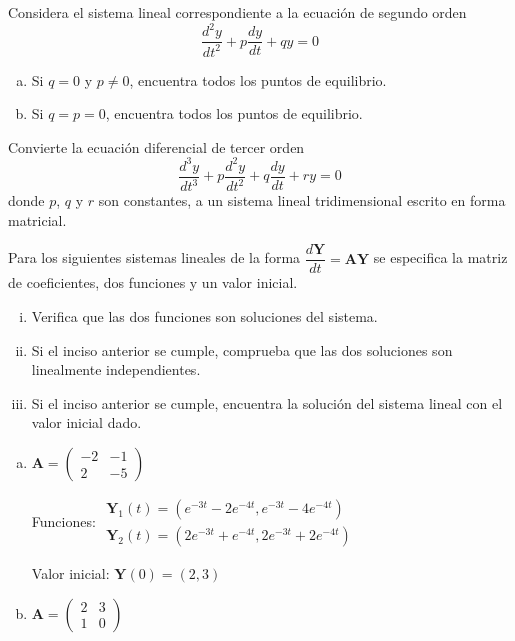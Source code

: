 \documentclass[12pt]{exam}
\begin{document}
    
    \begin{questions}
     \question%
     Considera el sistema lineal correspondiente a la ecuación de segundo orden $$\frac{d^2y}{dt^2}+p\frac{dy}{dt}+qy=0$$
     \begin{enumerate}[a)]
         \item Si $q=0$ y $p\neq0$, encuentra todos los puntos de equilibrio.
         \item Si $q=p=0$, encuentra todos los puntos de equilibrio.
     \end{enumerate}


     \question%
     Convierte la ecuación diferencial de tercer orden $$\frac{d^3y}{dt^3}+p\frac{d^2y}{dt^2}+q\frac{dy}{dt}+ry=0$$ donde $p$, $q$ y $r$ son constantes, a un sistema lineal tridimensional escrito en forma matricial.

     
     \question%
     Para los siguientes sistemas lineales de la forma $\dfrac{d\mathbf{Y}}{dt}=\mathbf{AY}$ se especifica la matriz de coeficientes,  dos funciones y un valor inicial. 
     \begin{enumerate}[i)]
         \item      Verifica que las dos funciones son soluciones del sistema.
         \item		Si el inciso anterior se cumple, comprueba que las dos soluciones son linealmente independientes.
          \item		Si el inciso anterior se cumple, encuentra la solución del sistema lineal con el valor inicial dado.
    \end{enumerate}
\vskip 20pt
    \begin{enumerate}[a)]
        \item $\mathbf{A}=\left(\begin{matrix}-2&-1\\2&-5\end{matrix}\right)$
        
        Funciones: $\begin{matrix}\mathbf{Y}_1(t)=(e^{-3t}-2e^{-4t},e^{-3t}-4e^{-4t})\phantom{1}\\\mathbf{Y}_2(t)=(2e^{-3t}+e^{-4t},2e^{-3t}+2e^{-4t})\end{matrix}$
        
        Valor inicial: $\mathbf{Y}(0)=(2,3)$
        \item $\mathbf{A}=\left(\begin{matrix}2&3\\1&0\end{matrix}\right)$
        

\end{enumerate}
\end{questions}
\end{document}
